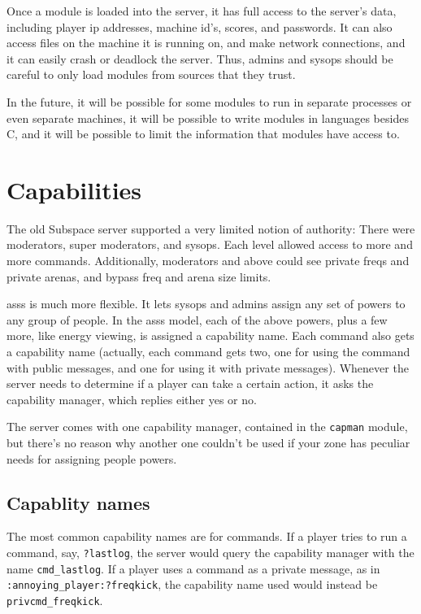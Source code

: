 \documentclass{article}
\newcommand{\asss}{asss}
\begin{document}
Once a module is loaded into the server, it has full access to the
server's data, including player ip addresses, machine id's, scores, and
passwords. It can also access files on the machine it is running on, and
make network connections, and it can easily crash or deadlock the
server. Thus, admins and sysops should be careful to only load modules
from sources that they trust.

In the future, it will be possible for some modules to run in separate
processes or even separate machines, it will be possible to write
modules in languages besides C, and it will be possible to limit the
information that modules have access to.


\section{Capabilities}

The old Subspace server supported a very limited notion of authority:
There were moderators, super moderators, and sysops. Each level allowed
access to more and more commands. Additionally, moderators and above
could see private freqs and private arenas, and bypass freq and arena
size limits.

\asss{} is much more flexible. It lets sysops and admins assign any set
of powers to any group of people. In the \asss{} model, each of the
above powers, plus a few more, like energy viewing, is assigned a
capability name. Each command also gets a capability name (actually,
each command gets two, one for using the command with public messages,
and one for using it with private messages). Whenever the server needs
to determine if a player can take a certain action, it asks the
capability manager, which replies either yes or no.

The server comes with one capability manager, contained in the
\texttt{capman} module, but there's no reason why another one couldn't
be used if your zone has peculiar needs for assigning people powers.

\subsection{Capablity names}

The most common capability names are for commands. If a player tries
to run a command, say, \verb/?lastlog/, the server would query the
capability manager with the name \verb/cmd_lastlog/. If a player uses a
command as a private message, as in \verb/:annoying_player:?freqkick/,
the capability name used would instead be \verb/privcmd_freqkick/.
\end{document}
